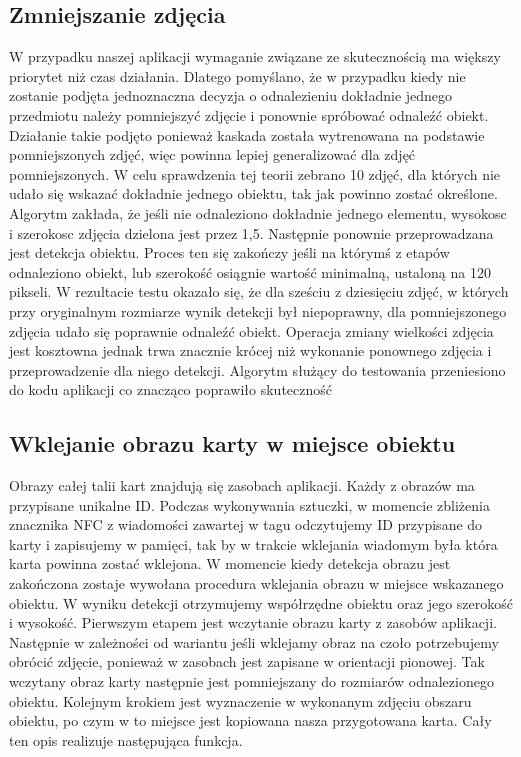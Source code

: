 \subsection{Zmniejszanie zdjęcia}
W przypadku naszej aplikacji wymaganie związane ze skutecznością ma większy priorytet niż czas działania. Dlatego pomyślano, że w przypadku kiedy nie zostanie podjęta jednoznaczna decyzja o odnalezieniu dokładnie jednego przedmiotu należy pomniejszyć zdjęcie i ponownie spróbować odnaleźć obiekt. Działanie takie podjęto ponieważ kaskada została wytrenowana na podstawie pomniejszonych zdjęć, więc powinna lepiej generalizować dla zdjęć pomniejszonych. W celu sprawdzenia tej teorii zebrano 10 zdjęć, dla których nie udało się wskazać dokładnie jednego obiektu, tak jak powinno zostać określone. Algorytm zakłada, że jeśli nie odnaleziono dokładnie jednego elementu, wysokosc i szerokosc zdjęcia dzielona jest przez 1,5. Następnie ponownie przeprowadzana jest detekcja obiektu. Proces ten się zakończy jeśli na którymś z etapów odnaleziono obiekt, lub szerokość osiągnie wartość minimalną, ustaloną na 120 pikseli. W rezultacie testu okazało się, że dla sześciu z dziesięciu zdjęć, w których przy oryginalnym rozmiarze wynik detekcji był niepoprawny, dla pomniejszonego zdjęcia udało się poprawnie odnaleźć obiekt. Operacja zmiany wielkości zdjęcia jest kosztowna jednak trwa znacznie krócej niż wykonanie ponownego zdjęcia i przeprowadzenie dla niego detekcji. Algorytm służący do testowania przeniesiono do kodu aplikacji co znacząco poprawiło skuteczność

\subsection{Wklejanie obrazu karty w miejsce obiektu}

Obrazy całej talii kart znajdują się zasobach aplikacji. Każdy z obrazów ma przypisane unikalne ID. Podczas wykonywania sztuczki, w momencie zbliżenia znacznika NFC z wiadomości zawartej w tagu odczytujemy ID przypisane do karty i zapisujemy w pamięci, tak by w trakcie wklejania wiadomym była która karta powinna zostać wklejona. 
W momencie kiedy detekcja obrazu jest zakończona zostaje wywołana procedura wklejania obrazu w miejsce wskazanego obiektu. W wyniku detekcji otrzymujemy współrzędne obiektu oraz jego szerokość i wysokość. Pierwszym etapem jest wczytanie obrazu karty z zasobów aplikacji. Następnie w zależności od wariantu jeśli wklejamy obraz na czoło potrzebujemy obrócić zdjęcie, ponieważ w zasobach jest zapisane w orientacji pionowej. Tak wczytany obraz karty następnie jest pomniejszany do rozmiarów odnalezionego obiektu. Kolejnym krokiem jest wyznaczenie w wykonanym zdjęciu obszaru obiektu, po czym w to miejsce jest kopiowana nasza przygotowana karta. Cały ten opis realizuje następująca funkcja.

